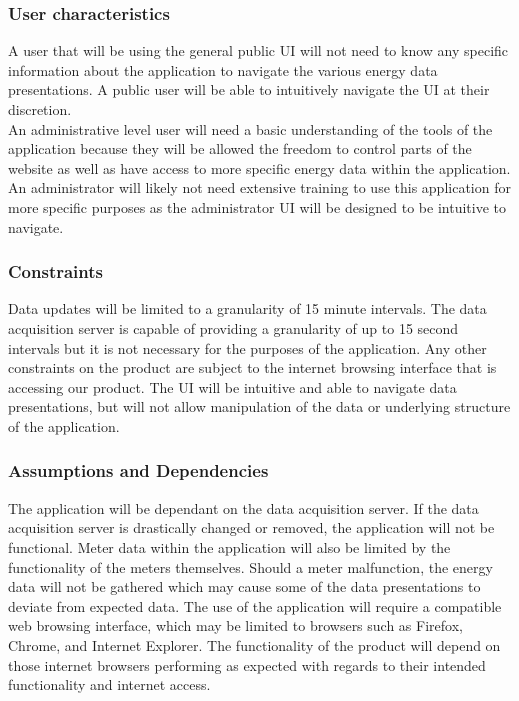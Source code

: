     \subsubsection{User characteristics}
    A user that will be using the general public UI will not need to know any specific information about the application to navigate the various energy data presentations. A public user will be able to intuitively navigate the UI at their discretion. \\ 
    An administrative level user will need a basic understanding of the tools of the application because they will be allowed the freedom to control parts of the website as well as have access to more specific energy data within the application. An administrator will likely not need extensive training to use this application for more specific purposes as the administrator UI will be designed to be intuitive to navigate.
    \subsubsection{Constraints}
    Data updates will be limited to a granularity of 15 minute intervals. The data acquisition server is capable of providing a granularity of up to 15 second intervals but it is not necessary for the purposes of the application. Any other constraints on the product are subject to the internet browsing interface that is accessing our product. The UI will be intuitive and able to navigate data presentations, but will not allow manipulation of the data or underlying structure of the application.
    
    \subsubsection{Assumptions and Dependencies}
    The application will be dependant on the data acquisition server. If the data acquisition server is drastically changed or removed, the application will not be functional. Meter data within the application will also be limited by the functionality of the meters themselves. Should a meter malfunction, the energy data will not be gathered which may cause some of the data presentations to deviate from expected data. The use of the application will require a compatible web browsing interface, which may be limited to browsers such as Firefox, Chrome, and Internet Explorer. The functionality of the product will depend on those internet browsers performing as expected with regards to their intended functionality and internet access. 

